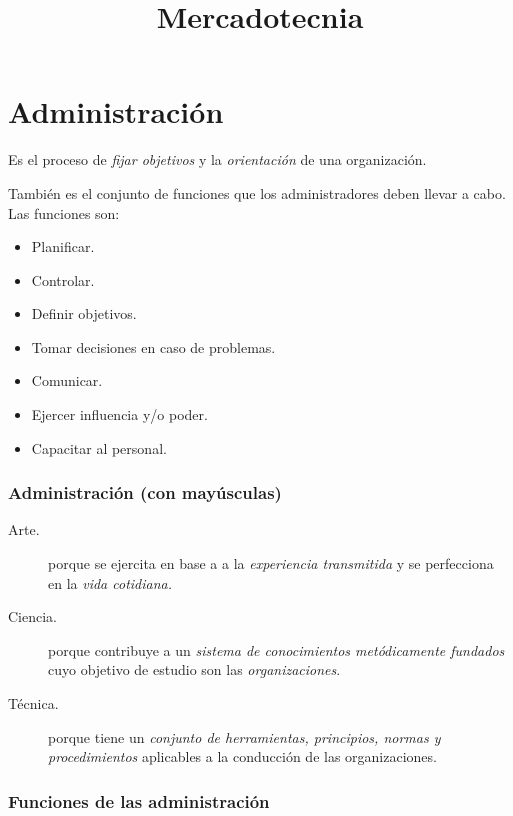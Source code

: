 \documentclass[10pt, spanish, a5paper]{article}
\begin{document}
\title{\textbf{Mercadotecnia}}

\maketitle


\tableofcontents



\newpage



\part{Administración}
Es el proceso de \emph{fijar objetivos} y la \emph{orientación} de una organización.

También es el conjunto de funciones que los administradores deben llevar a cabo. Las funciones son:
\begin{itemize}
	\item Planificar.
	\item Controlar.
	\item Definir objetivos.
	\item Tomar decisiones en caso de problemas.
	\item Comunicar.
	\item Ejercer influencia y/o poder.
	\item Capacitar al personal.
\end{itemize}

\section{Administración (con mayúsculas)}
\begin{description}
	\item[Arte.]	porque se ejercita en base a a la \emph{experiencia transmitida} y  se perfecciona en la \emph{vida cotidiana.}
\item[Ciencia.] porque contribuye a un \emph{sistema de conocimientos metódicamente fundados} cuyo objetivo de estudio son las \emph{organizaciones}.
\item[Técnica.] porque tiene un \emph{conjunto de herramientas, principios, normas y procedimientos} aplicables a la conducción de las organizaciones.
\end{description}

\section{Funciones de las administración}
\end{document}
